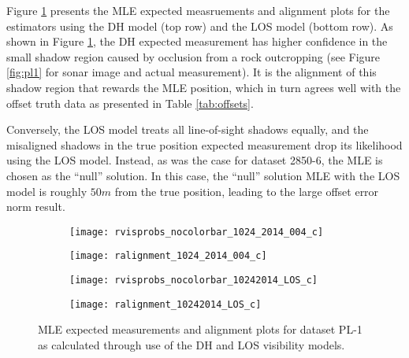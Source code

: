 Figure \ref{fig:los3} presents the MLE expected measruements and alignment plots for the estimators using the DH model (top row) and the LOS model (bottom row).
As shown in Figure \ref{fig:los3}, the DH expected measurement has higher confidence in the small shadow region caused by occlusion from a rock outcropping (see Figure \ref{fig:pl1} for sonar image and actual measurement).
It is the alignment of this shadow region that rewards the MLE position, which in turn agrees well with the offset truth data as presented in Table \ref{tab:offsets}.

Conversely, the LOS model treats all line-of-sight shadows equally, and the misaligned shadows in the true position expected measurement drop its likelihood using the LOS model.
Instead, as was the case for dataset 2850-6, the MLE is chosen as the ``null'' solution.
In this case, the ``null'' solution MLE with the LOS model is roughly $50m$ from the true position, leading to the large offset error norm result.

\begin{figure} [h!]
	\centering
	\begin{subfigure}[b]{0.4\textwidth}
                \texttt{[image: rvisprobs\_nocolorbar\_1024\_2014\_004\_c]}
                \caption{}
	\end{subfigure}
  	\centering
	\begin{subfigure}[b]{0.4\textwidth}
                \texttt{[image: ralignment\_1024\_2014\_004\_c]}
		\caption{}
  	\end{subfigure}
  	
  	\centering
	\begin{subfigure}[b]{0.4\textwidth}
                \texttt{[image: rvisprobs\_nocolorbar\_10242014\_LOS\_c]}
		\caption{}
  	\end{subfigure}
  	\centering
	\begin{subfigure}[b]{0.4\textwidth}
                \texttt{[image: ralignment\_10242014\_LOS\_c]}
		\caption{}
  	\end{subfigure}
  	
	\caption{MLE expected measurements and alignment plots for dataset PL-1 as calculated through use of the DH and LOS visibility models.}
	\label{fig:los3}
\end{figure}